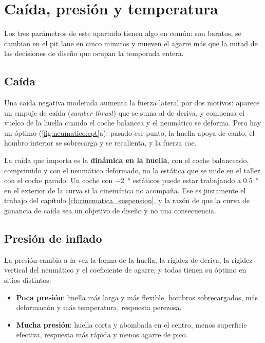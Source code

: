 \section{Caída, presión y temperatura}
\label{sec:neumatico:05}

Los tres parámetros de este apartado tienen algo en común: son baratos, se
cambian en el pit lane en cinco minutos y mueven el agarre más que la mitad de
las decisiones de diseño que ocupan la temporada entera.

\subsection{Caída}

Una caída negativa moderada aumenta la fuerza lateral por dos motivos: aparece un
empuje de caída (\emph{camber thrust}) que se suma al de deriva, y compensa el
vuelco de la huella cuando el coche balancea y el neumático se deforma. Pero hay
un óptimo (\cref{fig:neumatico:cpt}a): pasado ese punto, la huella apoya de
canto, el hombro interior se sobrecarga y se recalienta, y la fuerza cae.

\begin{ojo}
La caída que importa es la \textbf{dinámica en la huella}, con el coche
balanceado, comprimido y con el neumático deformado, no la estática que se mide
en el taller con el coche parado. Un coche con \SI{-2}{\degree} estáticos puede
estar trabajando a \SI{+0.5}{\degree} en el exterior de la curva si la
cinemática no acompaña. Ese es justamente el trabajo del capítulo
\ref{ch:cinematica_suspension}, y la razón de que la curva de ganancia de caída
sea un objetivo de diseño y no una consecuencia.
\end{ojo}

\subsection{Presión de inflado}

La presión cambia a la vez la forma de la huella, la rigidez de deriva, la
rigidez vertical del neumático y el coeficiente de agarre, y todas tienen su
óptimo en sitios distintos:

\begin{itemize}
  \item \textbf{Poca presión}: huella más larga y más flexible, hombros
        sobrecargados, más deformación y más temperatura, respuesta perezosa.
  \item \textbf{Mucha presión}: huella corta y abombada en el centro, menos
        superficie efectiva, respuesta más rápida y menos agarre de pico.
\end{itemize}

